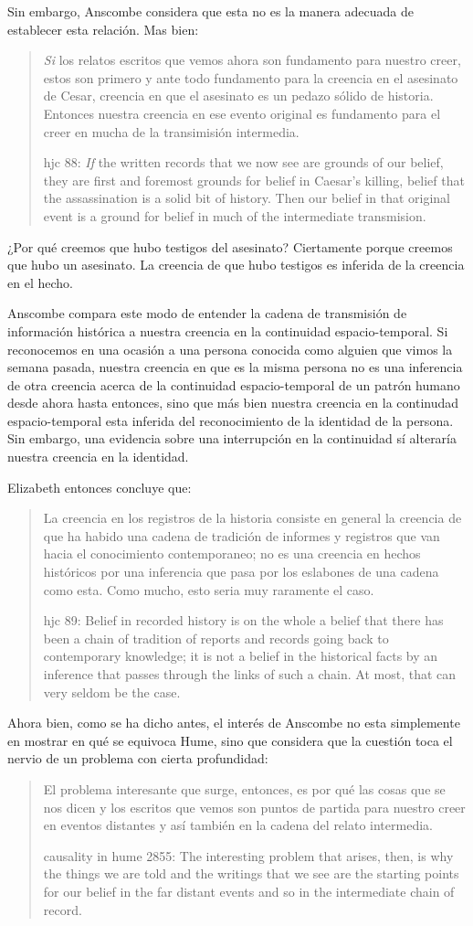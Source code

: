 Sin embargo, Anscombe considera que esta no es la manera adecuada de establecer
esta relación. Mas bien: \blockquote[hjc 88: \emph{If} the written records that
we now see are grounds of our belief, they are first and foremost grounds for
belief in Caesar's killing, belief that the assassination is a solid bit of
history. Then our belief in that original event is a ground for belief in much
of the intermediate transmision.]{\emph{Si} los relatos escritos que vemos ahora
  son fundamento para nuestro creer, estos son primero y ante todo fundamento
  para la creencia en el asesinato de Cesar, creencia en que el asesinato es un
  pedazo sólido de historia. Entonces nuestra creencia en ese evento original es
  fundamento para el creer en mucha de la transimisión intermedia.}
¿Por qué creemos que hubo testigos del asesinato? Ciertamente porque creemos que
hubo un asesinato. La creencia de que hubo testigos es inferida de la creencia
en el hecho.

Anscombe compara este modo de entender la cadena de transmisión de información
histórica a nuestra creencia en la continuidad espacio-temporal. Si reconocemos
en una ocasión a una persona conocida como alguien que vimos la semana pasada,
nuestra creencia en que es la misma persona no es una inferencia de otra
creencia acerca de la continuidad espacio-temporal de un patrón humano desde
ahora hasta entonces, sino que más bien nuestra creencia en la continudad
espacio-temporal esta inferida del reconocimiento de la identidad de la persona.
Sin embargo, una evidencia sobre una interrupción en la continuidad sí alteraría
nuestra creencia en la identidad.

Elizabeth entonces concluye que: \blockquote[hjc 89: Belief in recorded history is
on the whole a belief that there has been a chain of tradition of reports and
records going back to contemporary knowledge; it is not a belief in the
historical facts by an inference that passes through the links of such a chain.
At most, that can very seldom be the case.]{La creencia en los registros de la
  historia consiste en general la creencia de que ha habido una cadena de
  tradición de informes y registros que van hacia el conocimiento contemporaneo;
  no es una creencia en hechos históricos por una inferencia que pasa por los
  eslabones de una cadena como esta. Como mucho, esto seria muy raramente el
  caso.}

Ahora bien, como se ha dicho antes, el interés de Anscombe no esta simplemente
en mostrar en qué se equivoca Hume, sino que considera que la cuestión toca el
nervio de un problema con cierta profundidad:
\blockquote[causality in hume 2855: The interesting problem that arises, then,
is why the things we are told and the writings that we see are the starting
points for our belief in the far distant events and so in the intermediate chain
of record.]{El problema interesante que surge, entonces, es por qué las cosas
  que se nos dicen y los escritos que vemos son puntos de partida para nuestro
  creer en eventos distantes y así también en la cadena del relato intermedia.}

